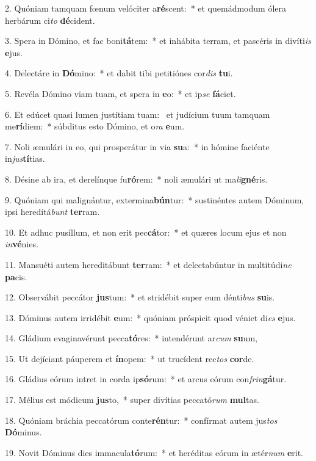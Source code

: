 2. Quóniam tamquam fœnum velóciter a\textbf{ré}scent:~*  et quemádmodum ólera herbárum ci\textit{to} \textbf{dé}cident.\

3. Spera in Dómino, et fac boni\textbf{tá}tem:~*  et inhábita terram, et pascéris in divíti\textit{is} \textbf{e}jus.\

4. Delectáre in \textbf{Dó}mino:~*  et dabit tibi petitiónes cor\textit{dis} \textbf{tu}i.\

5. Revéla Dómino viam tuam, et spera in \textbf{e}o:~*  et ip\textit{se} \textbf{fá}ciet.\

6. Et edúcet quasi lumen justítiam tuam: \dag\  et judícium tuum tamquam me\textbf{rí}diem:~*  súbditus esto Dómino, et o\textit{ra} \textbf{e}um.\

7. Noli æmulári in eo, qui prosperátur in via \textbf{su}a:~*  in hómine faciénte in\textit{jus}\textbf{tí}tias.\

8. Désine ab ira, et derelínque fu\textbf{ró}rem:~*  noli æmulári ut ma\textit{li}\textbf{gné}ris.\

9. Quóniam qui malignántur, extermina\textbf{bún}tur:~*  sustinéntes autem Dóminum, ipsi hereditá\textit{bunt} \textbf{ter}ram.\

10. Et adhuc pusíllum, et non erit pec\textbf{cá}tor:~*  et quæres locum ejus et non \textit{in}\textbf{vé}nies.\

11. Mansuéti autem hereditábunt \textbf{ter}ram:~*  et delectabúntur in multitúdi\textit{ne} \textbf{pa}cis.\

12. Observábit peccátor \textbf{jus}tum:~*  et stridébit super eum dénti\textit{bus} \textbf{su}is.\

13. Dóminus autem irridébit \textbf{e}um:~*  quóniam próspicit quod véniet di\textit{es} \textbf{e}jus.\

14. Gládium evaginavérunt pecca\textbf{tó}res:~*  intendérunt ar\textit{cum} \textbf{su}um,\

15. Ut dejíciant páuperem et \textbf{ín}opem:~*  ut trucídent rec\textit{tos} \textbf{cor}de.\

16. Gládius eórum intret in corda ip\textbf{só}rum:~*  et arcus eórum con\textit{frin}\textbf{gá}tur.\

17. Mélius est módicum \textbf{jus}to,~*  super divítias peccató\textit{rum} \textbf{mul}tas.\

18. Quóniam bráchia peccatórum conte\textbf{rén}tur:~*  confírmat autem jus\textit{tos} \textbf{Dó}minus.\

19. Novit Dóminus dies immacula\textbf{tó}rum:~*  et heréditas eórum in ætér\textit{num} \textbf{e}rit.\

